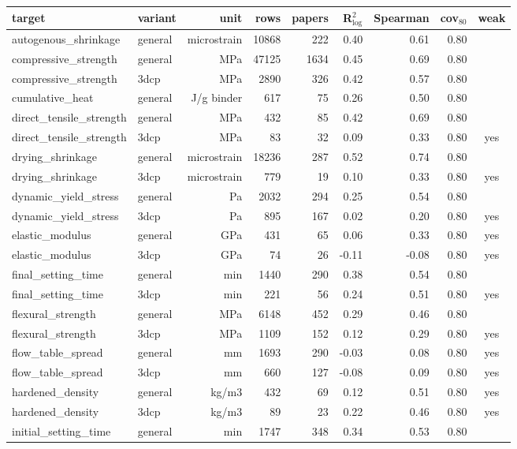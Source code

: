 \begin{tabular}{llrrrrrrc}
\toprule
target & variant & unit & rows & papers & R$^2_{\log}$ & Spearman & cov$_{80}$ & weak \\
\midrule
autogenous\_shrinkage & general & microstrain & 10868 & 222 & 0.40 & 0.61 & 0.80 &  \\
compressive\_strength & general & MPa & 47125 & 1634 & 0.45 & 0.69 & 0.80 &  \\
compressive\_strength & 3dcp & MPa & 2890 & 326 & 0.42 & 0.57 & 0.80 &  \\
cumulative\_heat & general & J/g binder & 617 & 75 & 0.26 & 0.50 & 0.80 &  \\
direct\_tensile\_strength & general & MPa & 432 & 85 & 0.42 & 0.69 & 0.80 &  \\
direct\_tensile\_strength & 3dcp & MPa & 83 & 32 & 0.09 & 0.33 & 0.80 & yes \\
drying\_shrinkage & general & microstrain & 18236 & 287 & 0.52 & 0.74 & 0.80 &  \\
drying\_shrinkage & 3dcp & microstrain & 779 & 19 & 0.10 & 0.33 & 0.80 & yes \\
dynamic\_yield\_stress & general & Pa & 2032 & 294 & 0.25 & 0.54 & 0.80 &  \\
dynamic\_yield\_stress & 3dcp & Pa & 895 & 167 & 0.02 & 0.20 & 0.80 & yes \\
elastic\_modulus & general & GPa & 431 & 65 & 0.06 & 0.33 & 0.80 & yes \\
elastic\_modulus & 3dcp & GPa & 74 & 26 & -0.11 & -0.08 & 0.80 & yes \\
final\_setting\_time & general & min & 1440 & 290 & 0.38 & 0.54 & 0.80 &  \\
final\_setting\_time & 3dcp & min & 221 & 56 & 0.24 & 0.51 & 0.80 & yes \\
flexural\_strength & general & MPa & 6148 & 452 & 0.29 & 0.46 & 0.80 &  \\
flexural\_strength & 3dcp & MPa & 1109 & 152 & 0.12 & 0.29 & 0.80 & yes \\
flow\_table\_spread & general & mm & 1693 & 290 & -0.03 & 0.08 & 0.80 & yes \\
flow\_table\_spread & 3dcp & mm & 660 & 127 & -0.08 & 0.09 & 0.80 & yes \\
hardened\_density & general & kg/m3 & 432 & 69 & 0.12 & 0.51 & 0.80 & yes \\
hardened\_density & 3dcp & kg/m3 & 89 & 23 & 0.22 & 0.46 & 0.80 & yes \\
initial\_setting\_time & general & min & 1747 & 348 & 0.34 & 0.53 & 0.80 &  \\

\end{tabular}
